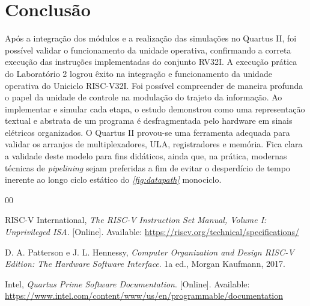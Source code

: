 \documentclass[conference]{IEEEtran}
\begin{document}
\section{Conclusão}
Após a integração dos módulos e a realização das simulações no Quartus II, foi possível validar o funcionamento da unidade operativa, confirmando a correta execução das instruções implementadas do conjunto RV32I. A execução prática do Laboratório 2 logrou êxito na integração e funcionamento da unidade operativa do Uniciclo RISC-V32I. Foi possível compreender de maneira profunda o papel da unidade de controle na modulação do trajeto da informação. Ao implementar e simular cada etapa, o estudo demonstrou como uma representação textual e abstrata de um programa é desfragmentada pelo hardware em sinais elétricos organizados. O Quartus II provou-se uma ferramenta adequada para validar os arranjos de multiplexadores, ULA, registradores e memória. Fica clara a validade deste modelo para fins didáticos, ainda que, na prática, modernas técnicas de \textit{pipelining} sejam preferidas a fim de evitar o desperdício de tempo inerente ao longo ciclo estático do \textit{\ref{fig:datapath}} monociclo.

\begin{thebibliography}{00}

RISC-V International, \textit{The RISC-V Instruction Set Manual, Volume I: Unprivileged ISA}. [Online]. Available: \url{https://riscv.org/technical/specifications/}

D. A. Patterson e J. L. Hennessy, \textit{Computer Organization and Design RISC-V Edition: The Hardware Software Interface}. 1a ed., Morgan Kaufmann, 2017.

Intel, \textit{Quartus Prime Software Documentation}. [Online]. Available: \url{https://www.intel.com/content/www/us/en/programmable/documentation}

\end{thebibliography}
\end{document}
